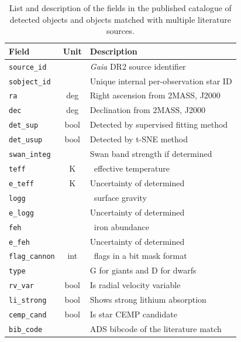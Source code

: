 \begin{table}
	\centering
	\caption{List and description of the fields in the published catalogue of detected objects and objects matched with multiple literature sources.}
	\label{tab:out_table}
	\begin{tabular}{l c l}
		\hline
		Field & Unit & Description \\ 
		\hline
		\texttt{source\_id} & & {\it Gaia} DR2 source identifier \\
		\texttt{sobject\_id} & & Unique internal per-observation star ID \\
		\texttt{ra} & deg & Right ascension from 2MASS, J2000 \\
		\texttt{dec} & deg & Declination from 2MASS, J2000 \\
		\texttt{det\_sup} & bool & Detected by supervised fitting method \\
		\texttt{det\_usup} & bool & Detected by t-SNE method \\
		\texttt{swan\_integ} & & Swan band strength if determined \\
		\texttt{teff} & K & \TC\ effective temperature \Teff \\
		\texttt{e\_teff} & K & Uncertainty of determined \Teff \\
		\texttt{logg} & & \TC\ surface gravity \Logg \\
		\texttt{e\_logg} & & Uncertainty of determined \Logg \\
		\texttt{feh} & & \TC\ iron abundance \Feh \\
		\texttt{e\_feh} & & Uncertainty of determined \Feh \\
		\texttt{flag\_cannon} & int & \TC\ flags in a bit mask format \\
		\texttt{type} &  & G for giants and D for dwarfs \\
		\texttt{rv\_var} & bool & Is radial velocity variable \\
		\texttt{li\_strong} & bool & Shows strong lithium absorption \\
		\texttt{cemp\_cand} & bool & Is star CEMP candidate \\
		\texttt{bib\_code} &  & ADS bibcode of the literature match \\
		\hline
	\end{tabular}
\end{table}


